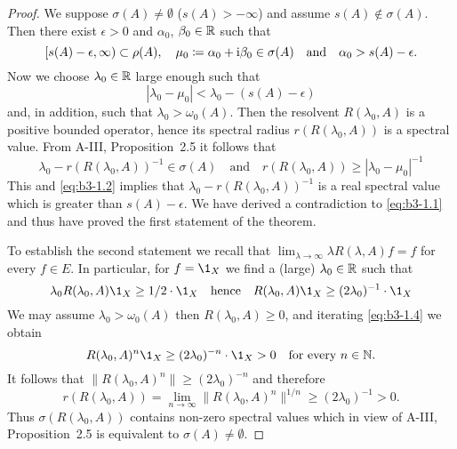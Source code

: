 \begin{proof}
	We suppose $\sigma(A) \neq \emptyset$ (\ie $s(A) > -\infty$) and assume $s(A) \notin \sigma(A)$.
	Then there exist $\epsilon > 0$ and $\alpha_{0}$, $\beta_{0} \in \mathbb{R}$ such that
	\begin{equation}\label{eq:b3-1.1}
		[s(A)-\epsilon,\infty) \subset \rho(A), \quad \mu_{0} \coloneqq \alpha_{0} + \mathrm{i}\beta_{0} \in \sigma(A) \quad \text{and} \quad \alpha_{0} > s(A)-\epsilon.
	\end{equation}
	Now we choose $\lambda_{0} \in \mathbb{R}$ large enough such that
	\begin{equation}\label{eq:b3-1.2}
		|\lambda_{0} - \mu_{0}| < \lambda_{0} - (s(A) - \epsilon)
	\end{equation}
	and, in addition, such that $\lambda_{0} > \omega_{0}(A)$.
	Then the resolvent $R(\lambda_{0},A)$ is a positive bounded operator, hence its spectral radius $r(R(\lambda_{0},A))$ is a spectral value.
	From A-III, Proposition~2.5 it follows that
	\begin{equation}\label{eq:b3-1.3}
		\lambda_{0} - r(R(\lambda_{0},A))^{-1} \in \sigma(A) \quad \text{and} \quad r(R(\lambda_{0},A)) \geq |\lambda_{0} - \mu_{0}|^{-1}
	\end{equation}
	This and \eqref{eq:b3-1.2} implies that $\lambda_{0} - r(R(\lambda_{0},A))^{-1}$ is a real spectral value which is greater than $s(A) - \epsilon$.
	We have derived a contradiction to \eqref{eq:b3-1.1} and thus have proved the first statement of the theorem.
	
	To establish the second statement we recall that $\lim_{\lambda \to \infty}\lambda R(\lambda,A)f = f$ for every $f \in E$.
	In particular, for $f = \1_{X}$ we find a (large) $\lambda_{0} \in \mathbb{R}$ such that
	\begin{equation}\label{eq:b3-1.4}
		\lambda_{0}R(\lambda_{0},A)\1_{X} \geq 1/2\cdot\1_{X} \quad \text{hence} \quad R(\lambda_{0},A)\1_{X} \geq (2\lambda_{0})^{-1}\cdot\1_{X}
	\end{equation}
	We may assume $\lambda_{0} > \omega_{0}(A)$ then $R(\lambda_{0},A) \geq 0$, and iterating \eqref{eq:b3-1.4} we obtain
	\begin{equation}\label{eq:b3-1.5}
		R(\lambda_{0},A)^{n}\1_{X} \geq (2\lambda_{0})^{-n}\cdot\1_{X} > 0 \quad \text{for every } n \in \N.
	\end{equation}
	It follows that $\|R(\lambda_{0},A)^{n}\| \geq (2\lambda_{0})^{-n}$ and therefore
	\begin{equation}\label{eq:b3-1.6}
		r(R(\lambda_{0},A)) = \lim_{n \to \infty}\|R(\lambda_{0},A)^{n}\|^{1/n} \geq (2\lambda_{0})^{-1} > 0.
	\end{equation}
	Thus $\sigma(R(\lambda_{0},A))$ contains non-zero spectral values which in view of A-III, Proposition~2.5 is equivalent to $\sigma(A) \neq \emptyset$.
\end{proof}
